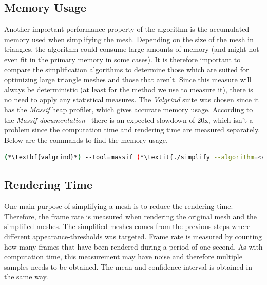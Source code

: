         \subsection{Memory Usage} \label{sec:memory_usage}

        Another important performance property of the algorithm is the accumulated memory used when simplifying the mesh. Depending on the size of the mesh in triangles, the algorithm could consume large amounts of memory (and might not even fit in the primary memory in some cases). It is therefore important to compare the simplification algorithms to determine those which are suited for optimizing large triangle meshes and those that aren't. Since this measure will always be deterministic (at least for the method we use to measure it), there is no need to apply any statistical measures. The \emph{Valgrind} suite was chosen since it has the \emph{Massif} heap profiler, which gives accurate memory usage. According to the \emph{Massif documentation}~\cite{valgrind2017manual} there is an expected slowdown of 20x, which isn't a problem since the computation time and rendering time are measured separately. Below are the commands to find the memory usage.

        \begin{lstlisting}[language=bash]
 (*\textbf{valgrind}*) --tool=massif (*\textit{./simplify --algorithm=<algorithm> <input-mesh> <output-mesh>}*)
        \end{lstlisting}

        \subsection{Rendering Time} \label{sec:rendering_time}
        One main purpose of simplifying a mesh is to reduce the rendering time. Therefore, the frame rate is measured when rendering the original mesh and the simplified meshes. The simplified meshes comes from the previous steps where different appearance-thresholds was targeted. Frame rate is measured by counting how many frames that have been rendered during a period of one second. As with computation time, this measurement may have noise and therefore multiple samples needs to be obtained. The mean and confidence interval is obtained in the same way.


